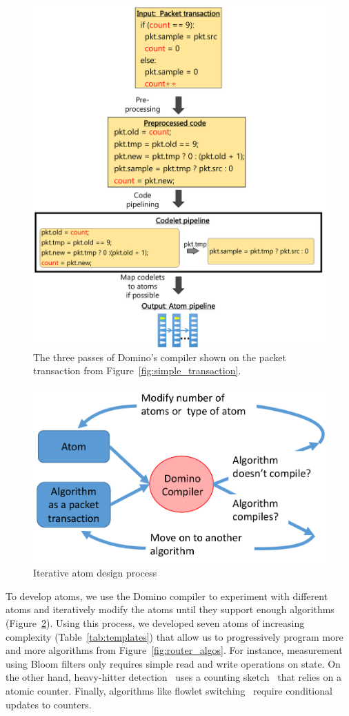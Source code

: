 \begin{figure}[!t]
\includegraphics[width=\textwidth]{compiler_passes_example.pdf}
\caption{The three passes of Domino's compiler shown on the packet transaction from Figure~\ref{fig:simple_transaction}.}
\label{fig:compiler_passes_example}
\end{figure}

\begin{figure}
\centering
\includegraphics[width=0.4\columnwidth]{iterative_design_process.pdf}
\caption{Iterative atom design process}
\label{fig:iterative_design}
\end{figure}

To develop atoms, we use the Domino compiler to experiment with different atoms
and iteratively modify the atoms until they support enough algorithms
(Figure~\ref{fig:iterative_design}).  Using this process, we developed seven
atoms of increasing complexity (Table~\ref{tab:templates}) that allow us to
progressively program more and more algorithms from
Figure~\ref{fig:router_algos}. For instance, measurement using Bloom filters
only requires simple read and write operations on state. On the other hand,
heavy-hitter detection~\cite{opensketch} uses a counting
sketch~\cite{cormode} that relies on a atomic counter. Finally, algorithms
like flowlet switching~\cite{flowlets} require conditional updates to counters.


